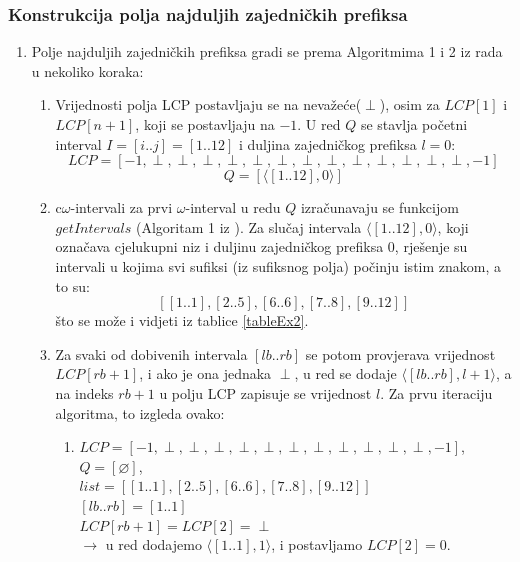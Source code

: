 \documentclass[a4paper,12pt]{article}
\begin{document}
\subsubsection{Konstrukcija polja najduljih zajedničkih prefiksa}

\begin{enumerate}
	\item Polje najduljih zajedničkih prefiksa gradi se prema Algoritmima 1 i 2 iz rada \cite{beller2013} u nekoliko koraka:

	\begin{enumerate}
		\item Vrijednosti polja LCP postavljaju se na nevažeće($\perp$), osim za $LCP[1]$ i $LCP[n+1]$, koji se postavljaju na $-1$. U red $Q$ se stavlja početni interval $I = [i..j] = [1..12]$ i duljina zajedničkog prefiksa $l = 0$:\\
	 	$$LCP = [-1,\perp,\perp,\perp,\perp,\perp,\perp,\perp,\perp,\perp,\perp,\perp,\perp, \perp, -1]$$
		$$Q = [\langle[1..12],0\rangle]$$

		\item c$\omega$-intervali za prvi $\omega$-interval u redu $Q$ izračunavaju se funkcijom $getIntervals$ (Algoritam 1 iz \cite{beller2013}). Za slučaj intervala $\langle[1..12],0\rangle$, koji označava cjelukupni niz i duljinu zajedničkog prefiksa $0$, rješenje su intervali u kojima svi sufiksi (iz sufiksnog polja) počinju istim znakom, a to su:
		$$ [[1..1],[2..5],[6..6],[7..8],[9..12]] $$
što se može i vidjeti iz tablice \ref{tableEx2}.

		\item Za svaki od dobivenih intervala $[lb..rb]$ se potom provjerava vrijednost $LCP[rb+1]$, i ako je ona jednaka $\perp$, u red se  dodaje $\langle[lb..rb],l+1\rangle$, a na indeks $rb+1$ u polju LCP zapisuje se vrijednost $l$. Za prvu iteraciju algoritma, to izgleda ovako:
			\begin{enumerate}
				\item $LCP = [-1,\perp,\perp,\perp,\perp,\perp,\perp,\perp,\perp,\perp,\perp, \perp, -1]$,\\
				$ Q = [\varnothing]$,\\
				$list = [[1..1],[2..5],[6..6],[7..8],[9..12]]$\\

				$ [lb..rb] = [1..1]$\\

				$LCP[rb+1]=LCP[2]=\perp$\\
				$\rightarrow$ u red dodajemo $\langle[1..1],1\rangle$, i postavljamo $LCP[2]=0$.
				\newline


\end{enumerate}
\end{enumerate}
\end{enumerate}
\end{document}
